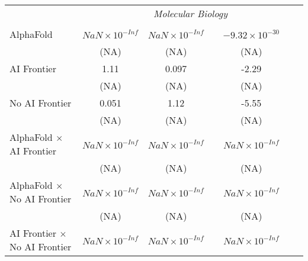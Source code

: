 \begin{tabular}{lcccccc}
 & \multicolumn{6}{c}{\textit{Molecular Biology}} \\ \\
   AlphaFold                                                                  & $NaN\times 10^{-Inf}$  & $NaN\times 10^{-Inf}$  &                         & $-9.32\times 10^{-30}$  &      &   \\   
                                                                              & (NA)                   & (NA)                   &                         & (NA)                    &      &   \\   
   AI Frontier                                                                & 1.11                   & 0.097                  &                         & -2.29                   &      &   \\   
                                                                              & (NA)                   & (NA)                   &                         & (NA)                    &      &   \\   
   No AI Frontier                                                             & 0.051                  & 1.12                   &                         & -5.55                   &      &   \\   
                                                                              & (NA)                   & (NA)                   &                         & (NA)                    &      &   \\   
   AlphaFold $\times$ AI Frontier                                             & $NaN\times 10^{-Inf}$  & $NaN\times 10^{-Inf}$  &                         & $NaN\times 10^{-Inf}$   &      &   \\   
                                                                              & (NA)                   & (NA)                   &                         & (NA)                    &      &   \\   
   AlphaFold $\times$ No AI Frontier                                          & $NaN\times 10^{-Inf}$  & $NaN\times 10^{-Inf}$  &                         & $NaN\times 10^{-Inf}$   &      &   \\   
                                                                              & (NA)                   & (NA)                   &                         & (NA)                    &      &   \\   
   AI Frontier $\times$ No AI Frontier                                        & $NaN\times 10^{-Inf}$  & $NaN\times 10^{-Inf}$  &                         & $NaN\times 10^{-Inf}$   &      &   \\   

\end{tabular}
